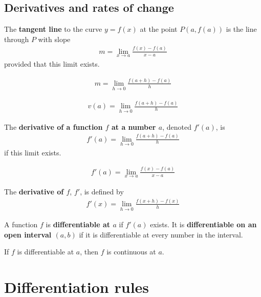 \documentclass{article}
\begin{document}
\subsection{Derivatives and rates of change}
\begin{definition}
	The \textbf{tangent line} to the curve $y=f(x)$ at the point $P(a, f(a))$ is the line through $P$ with slope
	\begin{align*}
		m=\lim_{x\to a}\frac{f(x)-f(a)}{x-a}
	\end{align*}
	provided that this limit exists.
\end{definition}
\begin{theorem}
	\begin{align*}
		m=\lim_{h\to 0}\frac{f(a + h)-f(a)}{h}
	\end{align*}
\end{theorem}
\begin{theorem}
	\begin{align*}
		v(a)=\lim_{h\to 0}\frac{f(a+h)-f(a)}{h}
	\end{align*}
\end{theorem}
\begin{definition}
	The \textbf{derivative of a function $f$ at a number $a$}, denoted $f'(a)$, is
	\begin{align*}
		f'(a)=\lim_{h\to 0}\frac{f(a+h)-f(a)}{h}
	\end{align*}
	if this limit exists.
\end{definition}
\begin{theorem}
	\begin{align*}
		f'(a)=\lim_{x\to a}\frac{f(x)-f(a)}{x-a}
	\end{align*}
\end{theorem}
\begin{definition}
	The \textbf{derivative of $f$}, $f'$, is defined by
	\begin{align*}
		f'(x)=\lim_{h\to 0}\frac{f(x+h)-f(x)}{h}
	\end{align*}
\end{definition}
\begin{definition}
	A function $f$ is \textbf{differentiable at $a$} if $f'(a)$ exists. It is \textbf{differentiable on an open interval $(a,b)$} if it is differentiable at every number in the interval.
\end{definition}
\begin{theorem}
	If $f$ is differentiable at $a$, then $f$ is continuous at $a$.
\end{theorem}
\section{Differentiation rules}
\end{document}

